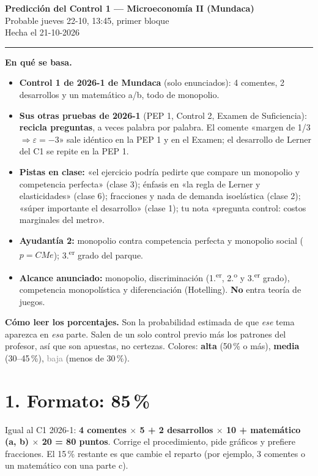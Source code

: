 \documentclass[11pt]{article}
\newcommand{\alta}[1]{\textbf{\textcolor{red!70!black}{#1}}}
\newcommand{\media}[1]{\textbf{\textcolor{orange!80!black}{#1}}}
\newcommand{\baja}[1]{\textcolor{gray}{#1}}
\begin{document}
\begin{center}
{\Large\bfseries Predicción del Control 1 --- Microeconomía II (Mundaca)}\\[4pt]
{\large Probable jueves 22-10, 13:45, primer bloque}\\[4pt]
Hecha el 21-10-2026
\end{center}

\hrule
\medskip

\textbf{En qué se basa.}
\begin{itemize}[leftmargin=*,itemsep=1pt]
\item \textbf{Control 1 de 2026-1 de Mundaca} (solo enunciados): 4 comentes, 2 desarrollos y un matemático a/b, todo de monopolio.
\item \textbf{Sus otras pruebas de 2026-1} (PEP 1, Control 2, Examen de Suficiencia): \textbf{recicla preguntas}, a veces palabra por palabra. El comente «margen de 1/3 $\Rightarrow \varepsilon = -3$» sale idéntico en la PEP 1 y en el Examen; el desarrollo de Lerner del C1 se repite en la PEP 1.
\item \textbf{Pistas en clase:} «el ejercicio podría pedirte que compare un monopolio y competencia perfecta» (clase 3); énfasis en «la regla de Lerner y elasticidades» (clase 6); fracciones y nada de demanda isoelástica (clase 2); «súper importante el desarrollo» (clase 1); tu nota «pregunta control: costos marginales del metro».
\item \textbf{Ayudantía 2:} monopolio contra competencia perfecta y monopolio social ($p = CMe$); 3.\textsuperscript{er} grado del parque.
\item \textbf{Alcance anunciado:} monopolio, discriminación (1.\textsuperscript{er}, 2.\textsuperscript{o} y 3.\textsuperscript{er} grado), competencia monopolística y diferenciación (Hotelling). \textbf{No} entra teoría de juegos.
\end{itemize}

\textbf{Cómo leer los porcentajes.} Son la probabilidad estimada de que \emph{ese} tema aparezca en \emph{esa} parte. Salen de un solo control previo más los patrones del profesor, así que son apuestas, no certezas. Colores: \alta{alta} (50\,\% o más), \media{media} (30--45\,\%), \baja{baja} (menos de 30\,\%).

\section*{1. Formato: \alta{85\,\%}}

Igual al C1 2026-1: \textbf{4 comentes $\times$ 5 + 2 desarrollos $\times$ 10 + matemático (a, b) $\times$ 20 = 80 puntos}. Corrige el procedimiento, pide gráficos y prefiere fracciones. El 15\,\% restante es que cambie el reparto (por ejemplo, 3 comentes o un matemático con una parte c).
\end{document}

